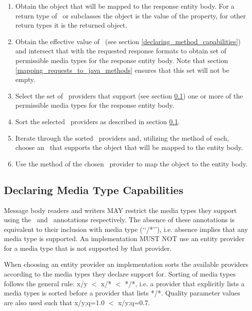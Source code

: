 \begin{enumerate}
\item Obtain the object that will be mapped to the response entity body. For a return type of \Response\ or subclasses the object is the value of the  property, for other return types it is the returned object.
\item Obtain the effective value of \ProduceMime\ (see section \ref{declaring_method_capabilities}) and intersect that with the requested response formats to obtain set of permissible media types for the response entity body. Note that section \ref{mapping_requests_to_java_methods} ensures that this set will not be empty.
\item Select the set of \MsgWrite\ providers that support (see section \ref{declaring_provider_capabilities}) one or more of the permissible media types for the response entity body.
\item Sort the selected \MsgWrite\ providers as described in section \ref{declaring_provider_capabilities}.
\item Iterate through the sorted \MsgWrite\ providers and, utilizing the  method of each, choose an \MsgWrite\ that supports the object that will be mapped to the entity body.
\item Use the  method of the chosen \MsgWrite\ provider to map the object to the entity body.
\end{enumerate}

\subsection{Declaring Media Type Capabilities}
\label{declaring_provider_capabilities}

Message body readers and writers MAY restrict the media types they support using the \ConsumeMime\ and \ProduceMime\ annotations respectively. The absence of these annotations is equivalent to their inclusion with media type (\lq\lq*/*\rq\rq), i.e. absence implies that any media type is supported. An implementation MUST NOT use an entity provider for a media type that is not supported by that provider.

When choosing an entity provider an implementation sorts the available providers according to the media types they declare support for. Sorting of media types follows the general rule: x/y $<$ x/* $<$ */*, i.e. a provider that explicitly lists a media types is sorted before a provider that lists */*. Quality parameter values are also used such that x/y;q=1.0 $<$ x/y;q=0.7.

